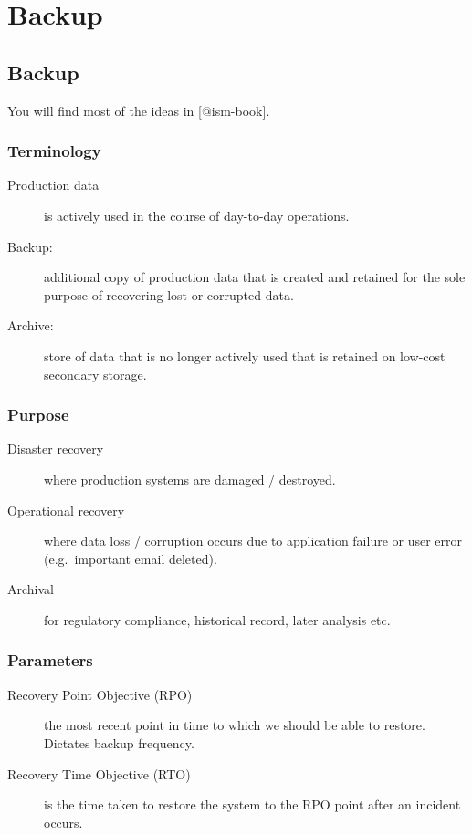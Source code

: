 \chapter{Backup}
\label{ch:backup}

\section{Backup}\label{backup}

You will find most of the ideas in {[}@ism-book{]}.

\subsection{Terminology}\label{terminology}

\begin{description}
\item[Production data]
is actively used in the course of day-to-day operations.
\item[Backup:]
additional copy of production data that is created and retained for the
sole purpose of recovering lost or corrupted data.
\item[Archive:]
store of data that is no longer actively used that is retained on
low-cost secondary storage.
\end{description}

\subsection{Purpose}\label{purpose}

\begin{description}
\item[Disaster recovery]
where production systems are damaged / destroyed.
\item[Operational recovery]
where data loss / corruption occurs due to application failure or user
error (e.g.~important email deleted).
\item[Archival]
for regulatory compliance, historical record, later analysis etc.
\end{description}

\subsection{Parameters}\label{parameters}

\begin{description}
\item[Recovery Point Objective (RPO)]
the most recent point in time to which we should be able to restore.
Dictates backup frequency.
\item[Recovery Time Objective (RTO)]
is the time taken to restore the system to the RPO point after an
incident occurs.
\end{description}

